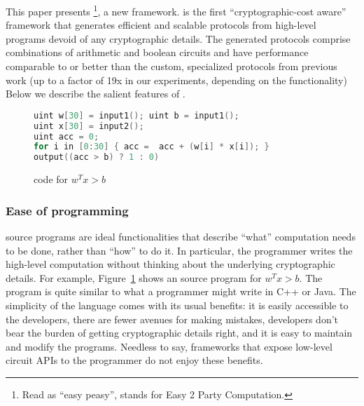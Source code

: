 This paper presents \tool\footnote{Read as ``easy peasy'',
stands for Easy 2 Party Computation.}, a new \mpc framework.
\tool is the first
``cryptographic-cost aware'' framework that generates efficient and
scalable \mpc protocols from high-level programs devoid of any
cryptographic details. The generated protocols comprise combinations
of arithmetic and boolean circuits and have performance comparable to
or better than the custom, specialized
protocols from previous work (up to a factor of 19x in our
experiments, depending on the functionality)   Below we describe
the salient features of \tool.

\begin{figure}
\begin{lstlisting}[language=C]
uint w[30] = input1(); uint b = input1();
uint x[30] = input2();
uint acc = 0;
for i in [0:30] { acc =  acc + (w[i] * x[i]); }
output((acc > b) ? 1 : 0)
\end{lstlisting}
\caption{\tool code for $w^Tx >b$}
\label{fig:ex-sml}
\end{figure}

\subsubsection*{Ease of programming} \tool source programs are ideal
functionalities that describe ``what'' computation needs to be done,
rather than ``how'' to do it. In particular, the programmer writes the
high-level computation without thinking about the underlying
cryptographic details. For example, Figure~\ref{fig:ex-sml}
shows an \tool source
program for $w^Tx >b$.
%
%
The program is quite similar to what a programmer might
write in C++ or Java. The simplicity of the
language comes with its usual benefits: it is easily accessible to the
developers, there are fewer avenues for making mistakes, developers
don't bear the burden of getting cryptographic details right, and it
is easy to maintain and modify the programs. Needless to say,
frameworks that expose low-level circuit APIs to the programmer do not
enjoy these benefits.

